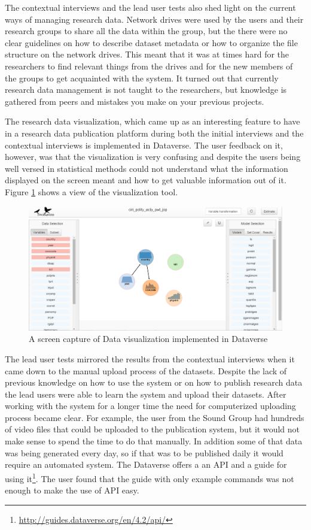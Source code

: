 The contextual interviews and the lead user tests also shed light on the
current ways of managing research data. Network drives were used by the
users and their research groups to share all the data within the group, but
the there were no clear guidelines on how to describe dataset metadata or how
to organize the file structure on the network drives. This meant that it was
at times hard for the researchers to find relevant things from the drives and
for the new members of the groups to get acquainted with the system. It turned
out that currently research data management is not taught to the researchers,
but knowledge is gathered from peers and mistakes you make on your previous
projects.

The research data visualization, which came up as an interesting feature to
have in a research data publication platform during both the initial interviews
and the contextual interviews is implemented in Dataverse. The user feedback
on it, however, was that the visualization is very confusing and despite the
users being well versed in statistical methods could not understand what the
information displayed on the screen meant and how to get valuable information
out of it. Figure \ref{fig:tworavens} shows a view of the visualization tool.

\begin{figure}
    \begin{centering}
        \includegraphics[width=\textwidth]{images/tworavens}
    \end{centering}
    \caption{A screen capture of Data visualization implemented in Dataverse}
    \label{fig:tworavens}
\end{figure}

The lead user tests mirrored the results from the contextual interviews when
it came down to the manual upload process of the datasets. Despite the lack of
previous knowledge on how to use the system or on how to publish research data
the lead users were able to learn the system and upload their datasets. After
working with the system for a longer time the need for computerized uploading
process became clear. For example, the user from the Sound Group had hundreds
of video files that could be uploaded to the publication system, but it would
not make sense to spend the time to do that manually. In addition some of that
data was being generated every day, so if that was to be published daily it
would require an automated system. The Dataverse offers a an API and a guide
for using it\footnote{\url{http://guides.dataverse.org/en/4.2/api/}}. The
user found that the guide with only example commands was
not enough to make the use of API easy.


